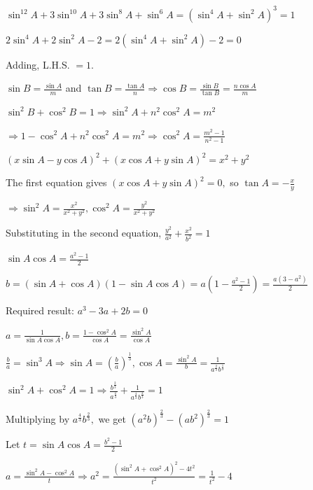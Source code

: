     $\sin^{12} A + 3\sin^{10} A + 3\sin^8 A + \sin^6 A = (\sin^4 A + \sin^2 A)^3 = 1$

    $2\sin^4 A + 2\sin^2 A - 2 = 2(\sin^4 A + \sin^2 A) - 2 = 0$

    Adding, L.H.S. $= 1$.

\item $\sin B = \frac{\sin A}{m}$ and $\tan B = \frac{\tan A}{n} \Rightarrow \cos B = \frac{\sin B}{\tan B} = \frac{n\cos A}{m}$

    $\sin^2 B + \cos^2 B = 1 \Rightarrow \sin^2 A + n^2\cos^2 A = m^2$

    $\Rightarrow 1 - \cos^2 A + n^2\cos^2 A = m^2 \Rightarrow \cos^2 A = \frac{m^2 - 1}{n^2 - 1}$

\item $(x\sin A - y\cos A)^2 + (x\cos A + y\sin A)^2 = x^2 + y^2$

    The first equation gives $(x\cos A + y\sin A)^2 = 0,$ so $\tan A = -\frac{x}{y}$

    $\Rightarrow \sin^2 A = \frac{x^2}{x^2 + y^2}, \cos^2 A = \frac{y^2}{x^2 + y^2}$

    Substituting in the second equation, $\frac{y^2}{a^2} + \frac{x^2}{b^2} = 1$

\item $\sin A\cos A = \frac{a^2 - 1}{2}$

    $b = (\sin A + \cos A)(1 - \sin A\cos A) = a\left(1 - \frac{a^2 - 1}{2}\right) = \frac{a(3 - a^2)}{2}$

    Required result: $a^3 - 3a + 2b = 0$

\item $a = \frac{1}{\sin A\cos A}, b = \frac{1 - \cos^2 A}{\cos A} = \frac{\sin^2 A}{\cos A}$

    $\frac{b}{a} = \sin^3 A \Rightarrow \sin A = \left(\frac{b}{a}\right)^{\frac{1}{3}}, \cos A = \frac{\sin^2 A}{b} =
    \frac{1}{a^{\frac{2}{3}}b^{\frac{1}{3}}}$

    $\sin^2 A + \cos^2 A = 1 \Rightarrow \frac{b^{\frac{2}{3}}}{a^{\frac{2}{3}}} + \frac{1}{a^{\frac{4}{3}}b^{\frac{2}{3}}} = 1$

    Multiplying by $a^{\frac{4}{3}}b^{\frac{2}{3}},$ we get $(a^2b)^{\frac{2}{3}} - (ab^2)^{\frac{2}{3}} = 1$

\item Let $t = \sin A\cos A = \frac{b^2 - 1}{2}$

    $a = \frac{\sin^2 A - \cos^2 A}{t} \Rightarrow a^2 = \frac{(\sin^2 A + \cos^2 A)^2 - 4t^2}{t^2} = \frac{1}{t^2} - 4$

